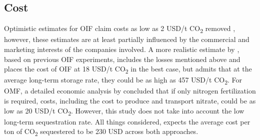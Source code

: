 \subsection*{Cost}
Optimistic estimates for OIF claim costs as low as 2 USD/t CO\textsubscript{2} removed \parencite{Fuentes-George2017ConsensusFertilization}, however, these estimates are at least partially influenced by the commercial and marketing interests of the companies involved. A more realistic estimate by \textcite{Harrison2013AOcean}, based on previous OIF experiments, includes the losses mentioned above and places the cost of OIF at 18 USD/t CO\textsubscript{2} in the best case, but admits that at the average long-term storage rate, they could be as high as 457 USD/t CO\textsubscript{2}.
For OMF, a detailed economic analysis by \textcite{S.F.Jones2014TheNourishment} concluded that if only nitrogen fertilization is required, costs, including the cost to produce and transport nitrate, could be as low as 20 USD/t CO\textsubscript{2}. However, this study does not take into account the low long-term sequestration rate.
All things considered, \textcite{Gattuso2021TheBeyond} expects the average cost per ton of CO\textsubscript{2} sequestered to be 230 USD across both approaches.
